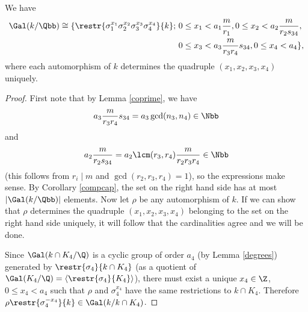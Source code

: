 \begin{prop}\label{gal}
We have 
\begin{equation*}
\begin{split}
\Gal(k/\Qbb)\cong
 \{\restr{\sigma_1^{x_1}\sigma_2^{x_2}\sigma_3^{x_3}\sigma_4^{x_4}}{k};~ & 0\leq x_1<a_1\frac{m}{r_1}, 0\leq x_2<a_2\frac{m}{r_2s_{34}}, \\ & 0\leq x_3<a_3\frac{m}{r_3r_4}s_{34},0\leq x_4<a_4\},
\end{split}
\end{equation*}
where each automorphism of $k$ determines the quadruple $(x_1,x_2,x_3,x_4)$ uniquely.
\end{prop}
\begin{proof}
First note that by Lemma \ref{coprime}, we have $$a_3\frac{m}{r_3r_4}s_{34}=a_3\gcd(n_3,n_4)\in\Nbb$$ and $$a_2\frac{m}{r_2s_{34}}=a_2\lcm(r_3,r_4)\frac{m}{r_2r_3r_4}\in\Nbb$$ (this follows from $r_i\mid m$ and $\gcd(r_2,r_3,r_4)=1$), so the expressions make sense. By Corollary \ref{compcap}, the set on the right hand side has at most $|\Gal(k/\Qbb)|$ elements. Now let $\rho$ be any automorphism of $k$. If we can show that $\rho$ determines the quadruple $(x_1,x_2,x_3,x_4)$ belonging to the set on the right hand side uniquely, it will follow that the cardinalities agree and we will be done.

\begin{center}
\end{center}

Since $\Gal(k\cap K_4/\Q)$ is a cyclic group of order $a_4$ (by Lemma \ref{degrees}) generated by $\restr{\sigma_4}{k\cap K_4}$ (as a quotient of $\Gal(K_4/\Q)=\langle \restr{\sigma_4}{K_4}\rangle$), there must exist a unique $x_4\in \Z$, $0\leq x_4<a_4$ such that $\rho$ and $\sigma_4^{x_4}$ have the same restrictions to $k\cap K_4$. Therefore $\rho\restr{\sigma_4^{-x_4}}{k}\in \Gal(k/k\cap K_4)$. 


\end{proof}

